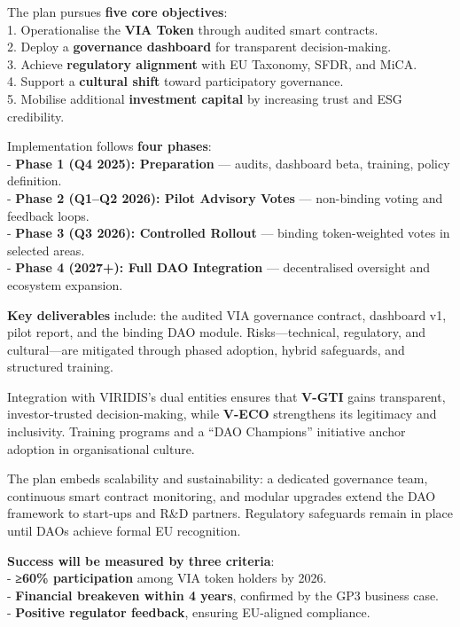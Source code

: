\documentclass[
  english,
  12pt,
  oneside,
  open=any]{scrbook}
\begin{document}
The plan pursues \textbf{five core objectives}:\\
1. Operationalise the \textbf{VIA Token} through audited smart
contracts.\\
2. Deploy a \textbf{governance dashboard} for transparent
decision-making.\\
3. Achieve \textbf{regulatory alignment} with EU Taxonomy, SFDR, and
MiCA.\\
4. Support a \textbf{cultural shift} toward participatory governance.\\
5. Mobilise additional \textbf{investment capital} by increasing trust
and ESG credibility.

Implementation follows \textbf{four phases}:\\
- \textbf{Phase 1 (Q4 2025): Preparation} --- audits, dashboard beta,
training, policy definition.\\
- \textbf{Phase 2 (Q1--Q2 2026): Pilot Advisory Votes} --- non-binding
voting and feedback loops.\\
- \textbf{Phase 3 (Q3 2026): Controlled Rollout} --- binding
token-weighted votes in selected areas.\\
- \textbf{Phase 4 (2027+): Full DAO Integration} --- decentralised
oversight and ecosystem expansion.

\textbf{Key deliverables} include: the audited VIA governance contract,
dashboard v1, pilot report, and the binding DAO module.
Risks---technical, regulatory, and cultural---are mitigated through
phased adoption, hybrid safeguards, and structured training.

Integration with VIRIDIS's dual entities ensures that \textbf{V-GTI}
gains transparent, investor-trusted decision-making, while
\textbf{V-ECO} strengthens its legitimacy and inclusivity. Training
programs and a ``DAO Champions'' initiative anchor adoption in
organisational culture.

The plan embeds scalability and sustainability: a dedicated governance
team, continuous smart contract monitoring, and modular upgrades extend
the DAO framework to start-ups and R\&D partners. Regulatory safeguards
remain in place until DAOs achieve formal EU recognition.

\textbf{Success will be measured by three criteria}:\\
- \textbf{≥60\% participation} among VIA token holders by 2026.\\
- \textbf{Financial breakeven within 4 years}, confirmed by the GP3
business case.\\
- \textbf{Positive regulator feedback}, ensuring EU-aligned compliance.
\end{document}
